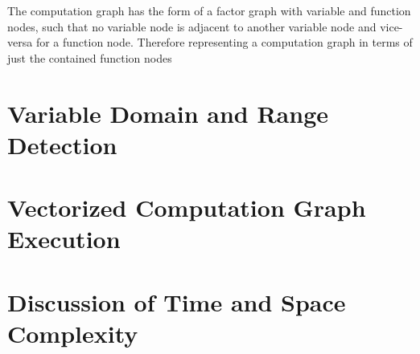 The computation graph has the form of a factor graph with variable and function nodes, such that no variable node is adjacent to another variable node and vice-versa for a function node. Therefore representing a computation graph in terms of just the contained function nodes

\section{Variable Domain and Range Detection\label{sec:var_domain_range}}

\section{Vectorized Computation Graph Execution\label{sec:cg_execution}}

\section{Discussion of Time and Space Complexity\label{sec:cg_complexity}}
